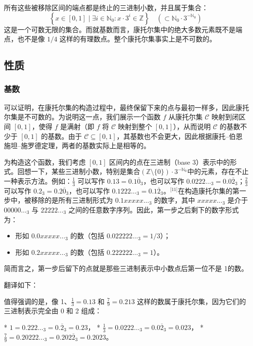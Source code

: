 所有这些被移除区间的端点都是终止的三进制小数，并且属于集合：
$$
\left\{ x \in [0,1] \mid \exists i \in \mathbb{N}_0: x \cdot 3^i \in \mathbb{Z} \right\} \quad \left( \subset \mathbb{N}_0 \cdot 3^{-\mathbb{N}_0} \right)~
$$
这是一个可数无限的集合。而就基数而言，康托尔集中的绝大多数元素既不是端点，也不是像 $1/4$ 这样的有理数点。整个康托尔集事实上是不可数的。
\subsection{性质}
\subsubsection{基数}
可以证明，在康托尔集的构造过程中，最终保留下来的点与最初一样多，因此康托尔集是不可数的。为说明这一点，我们展示一个函数 $f$ 从康托尔集 $\mathcal{C}$ 映射到闭区间 $[0,1]$，使得 $f$ 是满射（即 $f$ 将 $\mathcal{C}$ 映射到整个 $[0,1]$），从而说明 $\mathcal{C}$ 的基数不少于 $[0,1]$ 的基数。由于 $\mathcal{C} \subseteq [0,1]$，其基数也不会更大，因此根据康托–伯恩施坦–施罗德定理，两者的基数实际上是相等的。

为构造这个函数，我们考虑 $[0,1]$ 区间内的点在三进制（base 3）表示中的形式。回想一下，某些三进制小数，特别是集合$\left( \mathbb{Z} \setminus \{0\} \right) \cdot 3^{-\mathbb{N}_0}$中的元素，存在不止一种表示方法。例如：$\frac{1}{3}$ 可以写作 $0.13 = 0.1\overline{0}_3$，也可以写作 $0.0222\ldots_3 = 0.0\overline{2}_3$；$\frac{2}{3}$ 可以写作 $0.2_3 = 0.2\overline{0}_3$，也可以写作 $0.1222\ldots_3 = 0.1\overline{2}_3$。\(^\text{[11]}\)在构造康托尔集的第一步中，被移除的是所有三进制形式为 $0.1xxxxx\ldots_3$ 的数字，其中 $xxxxx\ldots_3$ 是介于 $00000\ldots_3$ 与 $22222\ldots_3$ 之间的任意数字序列。因此，第一步之后剩下的数字形式为：
\begin{itemize}
\item 形如 $0.0xxxxx\ldots_3$ 的数（包括 $0.022222\ldots_3 = 1/3$）；
\item 形如 $0.2xxxxx\ldots_3$ 的数（包括 $0.222222\ldots_3 = 1$）。
\end{itemize}
简而言之，第一步后留下的点就是那些三进制表示中小数点后第一位不是 1的数。

翻译如下：

值得强调的是，像 1、$\frac{1}{3} = 0.13$ 和 $\frac{7}{9} = 0.213$ 这样的数属于康托尔集，因为它们的三进制表示完全由 0 和 2 组成：

* $1 = 0.222\ldots_3 = 0.\overline{2}_3 = 0.23$，
* $\frac{1}{3} = 0.0222\ldots_3 = 0.0\overline{2}_3 = 0.023$，
* $\frac{7}{9} = 0.20222\ldots_3 = 0.202\overline{2}_3 = 0.2023$。
